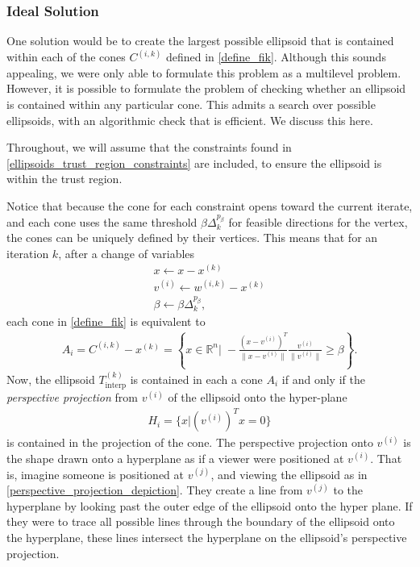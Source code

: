 \documentclass{article}
\theoremstyle{case}
\numberwithin{theorem}{subsection}
\newcommand{\ck}{{c^{(k)}}}
\newcommand{\dk}{\Delta_k}
\newcommand{\qk}{{Q^{(k)}}}
\newcommand{\Rn}{\mathbb R^n}
\newcommand{\sampletrk}{{T_{\text{interp}}^{(k)}}}
\newcommand{\sk}{{{s}^{(k)}}}
\newcommand{\wik}{{w^{(i, k)}}}
\newcommand{\xk}{x^{(k)}}
\newcommand{\fik}{{C^{(i, k)}}}
\begin{document}
\subsubsection{Ideal Solution}
\label{ideal_ellipsoid_in_polyhedron}

One solution would be to create the largest possible ellipsoid that is contained within each of the cones $\fik$ defined in \cref{define_fik}.
Although this sounds appealing, we were only able to formulate this problem as a multilevel problem.
However, it is possible to formulate the problem of checking whether an ellipsoid is contained within any particular cone.
This admits a search over possible ellipsoids, with an algorithmic check that is efficient.
We discuss this here.

Throughout, we will assume that the constraints found in \cref{ellipsoids_trust_region_constraints} are included, to ensure the ellipsoid is within the trust region.

Notice that because the cone for each constraint opens toward the current iterate,
and each cone uses the same threshold $\beta \dk^{p_\beta}$ for feasible directions for the vertex,
the cones can be uniquely defined by their vertices.
This means that for an iteration $k$, after a change of variables
\begin{align}
x \gets x - \xk \\
v^{(i)}  \gets \wik - \xk \\
\beta \gets \beta \dk^{p_{\beta}},
\end{align}
each cone in \cref{define_fik} is equivalent to
\begin{align*}
A_i = \fik - \xk = \left\{x\in\Rn\bigg|\;-\frac{(x - v^{(i)})^T}{\|x - v^{(i)}\|} \frac{v^{(i)}}{\|v^{(i)}\|} \ge \beta \right\}.
\end{align*}
Now, the ellipsoid $\sampletrk$ is contained in each a cone $A_i$ if and only if the \emph{perspective projection} from $v^{(i)}$ of the ellipsoid onto the hyper-plane 
\begin{align*}
H_i = \{x|\left(v^{(i)}\right)^Tx = 0\}
\end{align*}
is contained in the projection of the cone.
The perspective projection onto $v^{(i)}$ is the shape drawn onto a hyperplane as if a viewer were positioned at $v^{(i)}$.
That is, imagine someone is positioned at $v^{(j)}$, and viewing the ellipsoid as in \cref{perspective_projection_depiction}.
They create a line from $v^{(j)}$ to the hyperplane by looking past the outer edge of the ellipsoid onto the hyper plane.
If they were to trace all possible lines through the boundary of the ellipsoid onto the hyperplane, these lines intersect the hyperplane on the ellipsoid's perspective projection.
\end{document}
